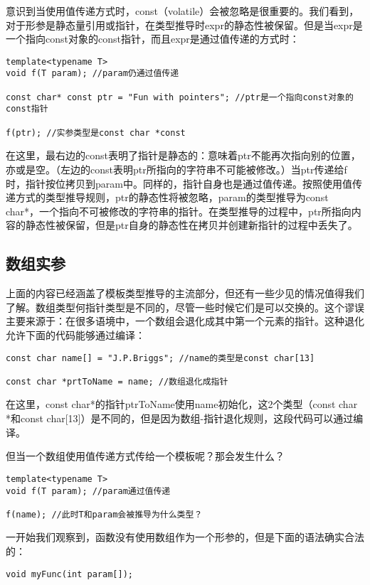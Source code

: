 意识到当使用值传递方式时，const（volatile）会被忽略是很重要的。我们看到，对于形参是静态量引用或指针，在类型推导时expr的静态性被保留。但是当expr是一个指向const对象的const指针，而且expr是通过值传递的方式时：

\begin{lstlisting}
template<typename T>
void f(T param); //param仍通过值传递

const char* const ptr = "Fun with pointers"; //ptr是一个指向const对象的const指针

f(ptr); //实参类型是const char *const
\end{lstlisting}

在这里，最右边的const表明了指针是静态的：意味着ptr不能再次指向别的位置，亦或是空。（左边的const表明ptr所指向的字符串不可能被修改。）当ptr传递给f时，指针按位拷贝到param中。同样的，指针自身也是通过值传递。按照使用值传递方式的类型推导规则，ptr的静态性将被忽略，param的类型推导为const char*，一个指向不可被修改的字符串的指针。在类型推导的过程中，ptr所指向内容的静态性被保留，但是ptr自身的静态性在拷贝并创建新指针的过程中丢失了。

\subsection*{数组实参}
上面的内容已经涵盖了模板类型推导的主流部分，但还有一些少见的情况值得我们了解。数组类型何指针类型是不同的，尽管一些时候它们是可以交换的。这个谬误主要来源于：在很多语境中，一个数组会退化成其中第一个元素的指针。这种退化允许下面的代码能够通过编译：
\begin{lstlisting}
const char name[] = "J.P.Briggs"; //name的类型是const char[13]

const char *prtToName = name; //数组退化成指针
\end{lstlisting}

在这里，const char*的指针ptrToName使用name初始化，这2个类型（const char *和const char[13]）是不同的，但是因为数组-指针退化规则，这段代码可以通过编译。

但当一个数组使用值传递方式传给一个模板呢？那会发生什么？

\begin{lstlisting}
template<typename T>
void f(T param); //param通过值传递

f(name); //此时T和param会被推导为什么类型？
\end{lstlisting}

一开始我们观察到，函数没有使用数组作为一个形参的，但是下面的语法确实合法的：

\begin{lstlisting}
void myFunc(int param[]);
\end{lstlisting}

